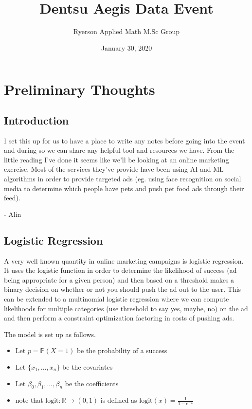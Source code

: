 \documentclass[12pt,a4paper]{book}
\title{Dentsu Aegis Data Event}
\author{Ryerson Applied Math M.Sc Group}
\date{January 30, 2020}
\newcommand{\Px}{\mathbb{P}}
\newcommand{\logit}{\text{logit}}
\newcommand{\R}{\mathbb{R}}
\begin{document}
\maketitle
\tableofcontents

\chapter{Preliminary Thoughts}

\section{Introduction}
I set this up for us to have a place to write any notes before going into the event and during so we can share any helpful tool and resources we have. From the little reading I've done it seems like we'll be looking at an online marketing exercise. Most of the services they've provide have been using AI and ML algorithms in order to provide targeted ads (eg. using face recognition on social media to determine which people have pets and push pet food ads through their feed). \\
\begin{flushright}
- Alin
\end{flushright}

\section{Logistic Regression}

A very well known quantity in online marketing campaigns is logistic regression. It uses the logistic function in order to determine the likelihood of success (ad being appropriate for a given person) and then based on a threshold makes a binary decision on whether or not you should push the ad out to the user. This can be extended to a multinomial logistic regression where we can compute likelihoods for multiple categories (use threshold to say yes, maybe, no) on the ad and then perform a constraint optimization factoring in costs of pushing ads. 

The model is set up as follows. 
\begin{itemize}
    \item Let $p = \Px (X=1)$ be the probability of a success 
    \item Let $\{ x_1, \ldots, x_n \}$ be the covariates 
    \item Let $\beta_0, \beta_1, \ldots, \beta_n$ be the coefficients
    \item note that $\logit: \R \rightarrow (0,1)$ is defined as $\logit(x) = \frac{1}{1-e^{-x}}$
\end{itemize}
\end{document}

